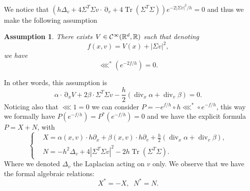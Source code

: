 \documentclass[12pt]{amsart}
\newcommand{\R}{\mathbb R}
\newcommand{\Tr}{{\operatorname{Tr}}}
\renewcommand{\div}{\operatorname{div}}
\numberwithin{equation}{section}
\numberwithin{figure}{section}
\DeclareMathOperator{\p}{\partial}
\newtheorem{assumption}{Assumption}
\begin{document}
We %
notice that $(h\Delta_v + 4\Sigma^T\Sigma v\cdot\p_v + 4\Tr(\Sigma^T\Sigma))e^{-2|\Sigma v|^2/h} = 0$ and thus we make the following assumption
\begin{assumption}\label{ass.skewadj}
    There exists $V\in\ccc^\infty(\R^d,\R)$ such that denoting
    \begin{equation}\label{eq:f}
    f(x,v) = V(x) + |\Sigma v|^2,
    \end{equation}
    we %
have
    \begin{equation*}
    \lll^*(e^{-2f/h}) = 0.
    \end{equation*}
\end{assumption}
In %
other words, this assumption %
is
\begin{equation}\label{eq:assskew}
\alpha\cdot\p_xV + 2\beta\cdot\Sigma^T\Sigma v - \frac h2(\div_x\alpha+\div_v\beta) = 0.
\end{equation}
Noticing %
also that $\lll1=0$ we can consider $P = -e^{f/h}\circ h\lll^*\circ e^{-f/h}$, this way we formally have $P(e^{-f/h}) = P^*(e^{-f/h}) = 0$ and we have the explicit formula $P = X + N$, %
with
\begin{equation}\label{eq:generalP}
\left\{
\begin{aligned}
&X=\alpha(x,v)\cdot h\partial_x + \beta(x,v)\cdot h\partial_v + \frac h2(\div_x\alpha+\div_v\beta),\\
&N=-h^2\Delta_v + 4|\Sigma^T\Sigma v|^2 - 2h\Tr(\Sigma^T\Sigma).
\end{aligned}
\right.
\end{equation}
Where %
we denoted $\Delta_v$ the Laplacian acting on $v$ only. We observe that we have the formal algebraic relations:
\begin{equation}\label{eq:adj0}
X^* = -X,\;\;N^* = N.
\end{equation}
\end{document}
